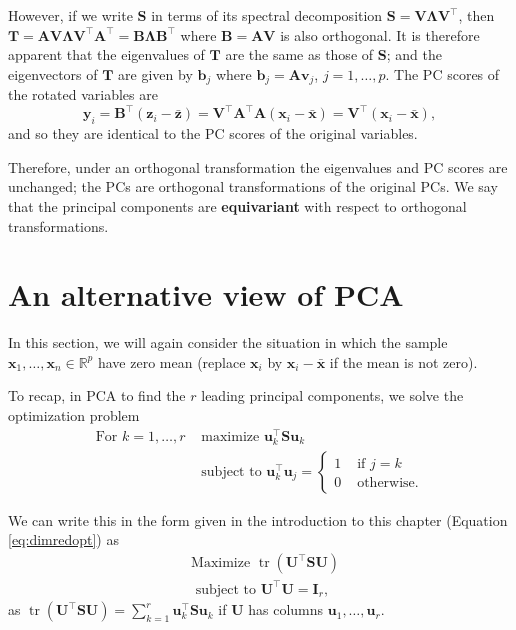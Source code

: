 \documentclass[
]{book}
\theoremstyle{definition}
\theoremstyle{definition}
\theoremstyle{definition}
\theoremstyle{definition}
\theoremstyle{remark}
\begin{document}
However, if we write \(\mathbf S\) in terms of its spectral decomposition \(\mathbf S= \mathbf V\boldsymbol \Lambda\mathbf V^\top\), then \(\mathbf T= \mathbf A\mathbf V\boldsymbol \Lambda\mathbf V^\top \mathbf A^\top = \mathbf B\boldsymbol \Lambda\mathbf B^\top\) where \(\mathbf B= \mathbf A\mathbf V\) is also orthogonal. It is therefore apparent that the eigenvalues of \(\mathbf T\) are the same as those of \(\mathbf S\); and the eigenvectors of \(\mathbf T\) are given by \(\mathbf b_j\) where \(\mathbf b_j = \mathbf A\mathbf v_j\), \(j=1,\ldots,p\). The PC scores of the rotated variables are
\[ \mathbf y_i = \mathbf B^\top (\mathbf z_i - \bar{\mathbf z}) = \mathbf V^\top \mathbf A^\top \mathbf A(\mathbf x_i - \bar{\mathbf x}) = \mathbf V^\top (\mathbf x_i - \bar{\mathbf x}),\]
and so they are identical to the PC scores of the original variables.

Therefore, under an orthogonal transformation the eigenvalues and PC scores are unchanged; the PCs are orthogonal transformations of the original PCs. We say that the principal components are \textbf{equivariant} with respect to orthogonal transformations.

\section{An alternative view of PCA}\label{an-alternative-view-of-pca}

In this section, we will again consider the situation in which the sample \(\mathbf x_1, \ldots ,  \mathbf x_n \in \mathbb{R}^p\) have zero mean (replace \(\mathbf x_i\) by \(\mathbf x_i-\bar{\mathbf x}\) if the mean is not zero).

To recap, in PCA to find the \(r\) leading principal components, we solve the optimization problem
\begin{align*}
\mbox{For } k=1, \ldots, r &\mbox{ maximize } \mathbf u_k^\top \mathbf S\mathbf u_k \\
 &\mbox{ subject to } \mathbf u_k^\top \mathbf u_j = \begin{cases}
 1  &\mbox{ if } j=k\\
 0 & \mbox{ otherwise.}
 \end{cases}
 \end{align*}

We can write this in the form given in the introduction to this chapter (Equation \eqref{eq:dimredopt}) as
\begin{align*}
&\mbox{Maximize } \operatorname{tr}(\mathbf U^\top \mathbf S\mathbf U) \\
 &\mbox{ subject to } \mathbf U^\top \mathbf U=\mathbf I_r,
 \end{align*}
as \(\operatorname{tr}(\mathbf U^\top \mathbf S\mathbf U) = \sum_{k=1}^r \mathbf u_k^\top \mathbf S\mathbf u_k\) if \(\mathbf U\) has columns \(\mathbf u_1, \ldots, \mathbf u_r\).
\end{document}
